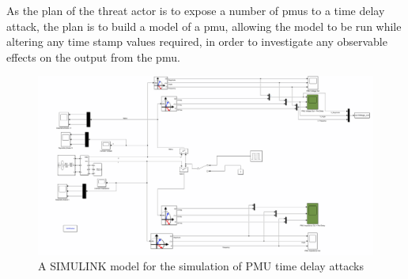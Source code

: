 As the plan of the threat actor is to expose  a number of \acrshort{pmu}s to a time  delay attack, the plan is to build a model of a \acrshort{pmu}, allowing the model to be run while altering any time stamp values required, in order to investigate any observable effects on the output from the \acrshort{pmu}.
 \begin{figure}[ht]
\centering
\includegraphics[width=\textwidth]{figures/SimPMU.png}
\caption[PmuSIM SIMULINK model]{A SIMULINK model for the simulation of PMU time delay attacks}

\end{figure}